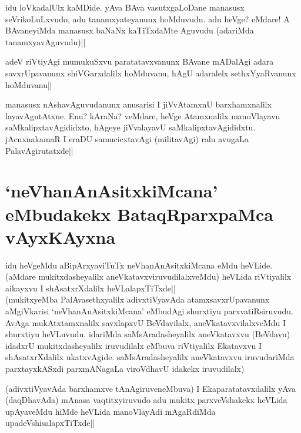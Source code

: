 \begin{artha} 
idu loVkadalUlx kaMDide. yAva BAva vasutxgaLoDane manasusx 
seVrikoLuLxvudo, adu tanamxyateyanunx hoMduvudu. adu heVge? eMdare! A 
BAvaneyiMda manasusx baNaNx kaTiTxdaMte Aguvudu (adariMda 
tanamxyavAguvudu)||
\end{artha}

\begin{artha} 
adeV riVtiyAgi mumukuSxvu paratatavxvanunx BAvane mADalAgi adara 
savxrUpavanunx shiVGarxdalilx hoMduvanu, hAgU adaralelx 
sethxYyaRvanunx hoMduvanu||
\end{artha}

\begin{artha} 
manasusx nAshavAguvudanunx anusarisi I jiVvAtamxnU barxhamxnalilx 
layavAgutAtxne. Enu? kAraNa? veMdare, heVge Atamxnalilx manoVlayavu 
saMkalipxtavAgididxto, hAgeye jiVvalayavU saMkalipxtavAgididxtu. 
jAcnxnakamaR I eraDU samucicxtavAgi (militavAgi) ralu avugaLa 
PalavAgirutatxde|| 
\end{artha}

\section*{`neVhanAnAsitxkiMcana' eMbudakekx BataqRparxpaMca vAyxKAyxna}


\begin{artha} 
idu heVgeMdu aBipArxyaviTuTx neVhanAnAsitxkiMcana eMdu heVLide. 
(aMdare mukitxdasheyalilx aneVkatavxviruvudilalxveMdu) heVLida 
riVtiyalilx aikayxvu I shAsatxrXdalilx heVLalapxTiTxde||\\
(mukitxyeMba PalAvasethxyalilx adivxtiVyavAda atamxsavxrUpavanunx 
aMgiVkarisi `neVhanAnAsitxkiMcana' eMbudAgi shurxtiyu 
parxvatiRsiruvudu. AvAga mukAtxtamxnalilx savxlapxvU BeVdavilalx, 
aneVkatavxvilalxveMdu I shurxtiyu heVLuvudu. idariMda 
saMsAradasheyalilx aneVkatavxvu (BeVdavu) idadxrU mukitxdasheyalilx 
iruvudilalx eMbuva riVtiyalilx Ekatavxvu I shAsatxrXdalilx 
ukatxvAgide. saMsAradasheyalilx aneVkatavxvu iruvudariMda 
parxtayxkASxdi parxmANagaLa viroVdhavU idakekx iruvudilalx)
\end{artha}


\begin{artha} 
(adivxtiVyavAda barxhamxve tAnAgiruveneMbuva) I Ekaparatatavxdalilx 
yAva (daqDhavAda) mAnasa vaqtitxyiruvudo adu mukitx parxveVshakekx 
heVLida upAyaveMdu hiMde heVLida manoVlayAdi mAgaRdiMda 
upadeVshisalapxTiTxde||
\end{artha}

